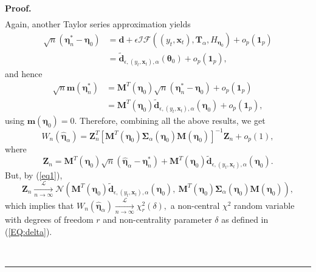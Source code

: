 \documentclass[a4paper]{article}%
\newenvironment{proof}[1][Proof]{\noindent \textbf{#1.} }{\  \rule{0.5em}{0.5em}}
\begin{document}
\begin{proof}
\begin{align}
\end{align}
Again, another Taylor series approximation yields
\begin{align}
\sqrt{n}(\boldsymbol{\eta}_{n}^{\ast}-\boldsymbol{\eta}_{0})  &
=\boldsymbol{d}+\epsilon\mathcal{IF}\left(  (y_{t},\boldsymbol{x}%
_{t}),\boldsymbol{T}_{\alpha},H_{\boldsymbol{\eta}_{0}}\right)  +o_{p}%
(\boldsymbol{1}_{p})\nonumber\\
&  =\widetilde{\boldsymbol{d}}_{\epsilon,(y_{t},\boldsymbol{x}_{t}),\alpha
}(\boldsymbol{\theta}_{0})+o_{p}(\boldsymbol{1}_{p}), \label{CDT}%
\end{align}
and hence
\begin{align}
\sqrt{n}\boldsymbol{m}\left(  \boldsymbol{\eta}_{n}^{\ast}\right)   &
=\boldsymbol{M}^{T}\left(  \boldsymbol{\eta}_{0}\right) \sqrt{n}%
(\boldsymbol{\eta}_{n}^{\ast}-\boldsymbol{\eta}_{0})+o_{p}(\boldsymbol{1}%
_{p})\nonumber\\
&  =\boldsymbol{M}^{T}\left(  \boldsymbol{\eta}_{0}\right)
\widetilde{\boldsymbol{d}}_{\epsilon,(y_{t},\boldsymbol{x}_{t}),\alpha
}(\boldsymbol{\eta}_{0})+o_{p}(\boldsymbol{1}_{p}), \label{EQ:eq1}%
\end{align}
using $\boldsymbol{m}\left(  \boldsymbol{\eta}_{0}\right)  =0$. Therefore,
combining all the above results, we get
\[
W_{n}\left(  \widehat{\boldsymbol{\eta}}_{\alpha}\right)  =\boldsymbol{Z}%
_{n}^{T}\left[  \boldsymbol{M}^{T}\left(  \boldsymbol{\eta}_{0}\right)
\boldsymbol{\Sigma}_{\alpha}\left(  \boldsymbol{\eta}_{0}\right)
\boldsymbol{M}\left(  \boldsymbol{\eta}_{0}\right)  \right]  ^{-1}%
\boldsymbol{Z}_{n}+o_{p}(1),
\]
where
\[
\boldsymbol{Z}_{n}=\boldsymbol{M}^{T}\left(  \boldsymbol{\eta}_{0}\right)
\sqrt{n}\left(  \widehat{\boldsymbol{\eta}}_{\alpha}-\boldsymbol{\eta}%
_{n}^{\ast}\right)  +\boldsymbol{M}^{T}\left(  \boldsymbol{\eta}_{0}\right)
\widetilde{\boldsymbol{d}}_{\epsilon,(y_{t},\boldsymbol{x}_{t}),\alpha
}(\boldsymbol{\eta}_{0}).
\]
But, by (\ref{eq1}),
\[
\boldsymbol{Z}_{n}\underset{n\rightarrow\infty}{\overset{\mathcal{L}%
}{\longrightarrow}}\mathcal{N}\left(  \boldsymbol{M}^{T}\left(
\boldsymbol{\eta}_{0}\right) \widetilde{\boldsymbol{d}}_{\epsilon
,(y_{t},\boldsymbol{x}_{t}),\alpha}(\boldsymbol{\eta}_{0}),\ \boldsymbol{M}%
^{T}\left(  \boldsymbol{\eta}_{0}\right) \boldsymbol{\Sigma}_{\alpha}\left(
\boldsymbol{\eta}_{0}\right)  \boldsymbol{M}\left(  \boldsymbol{\eta}%
_{0}\right)  \right)  ,
\]
which implies that $W_{n}\left(  \widehat{\boldsymbol{\eta}}_{\alpha}\right)
\underset{n\rightarrow\infty}{\overset{\mathcal{L}}{\longrightarrow}}\chi
_{r}^{2}(\delta),$ a non-central $\chi^{2}$ random variable with degrees of
freedom $r$ and non-centrality parameter $\delta$ as defined in
(\ref{EQ:delta}).


\end{proof}
\end{document}
